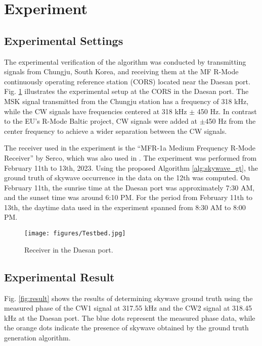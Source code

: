 \documentclass[conference]{IEEEtran}
\begin{document}
\section{Experiment}

\subsection{Experimental Settings}

The experimental verification of the algorithm was conducted by transmitting signals from Chungju, South Korea, and receiving them at the MF R-Mode continuously operating reference station (CORS) located near the Daesan port. 
Fig. \ref{fig:Testbed} illustrates the experimental setup at the CORS in the Daesan port. 
The MSK signal transmitted from the Chungju station has a frequency of 318 kHz, while the CW signals have frequencies centered at 318 kHz $\pm$ 450 Hz.
In contrast to the EU's R-Mode Baltic project, CW signals were added at $\pm$450 Hz from the center frequency to achieve a wider separation between the CW signals.

The receiver used in the experiment is the ``MFR-1a Medium Frequency R-Mode Receiver'' by Serco, which was also used in \cite{Johnson2020:R-Mode}. 
The experiment was performed from February 11th to 13th, 2023. 
Using the proposed Algorithm \ref{alg:skywave_gt}, the ground truth of skywave occurrence in the data on the 12th was computed. 
On February 11th, the sunrise time at the Daesan port was approximately 7:30 AM, and the sunset time was around 6:10 PM. 
For the period from February 11th to 13th, the daytime data used in the experiment spanned from 8:30 AM to 8:00 PM.

\begin{figure}
    \centering
    \texttt{[image: figures/Testbed.jpg]}
    \caption{Receiver in the Daesan port.}
    \label{fig:Testbed}
\end{figure}


\subsection{Experimental Result}

Fig. \ref{fig:result} shows the results of determining skywave ground truth using the measured phase of the CW1 signal at 317.55 kHz and the CW2 signal at 318.45 kHz at the Daesan port. 
The blue dots represent the measured phase data, while the orange dots indicate the presence of skywave obtained by the ground truth generation algorithm.
\end{document}
